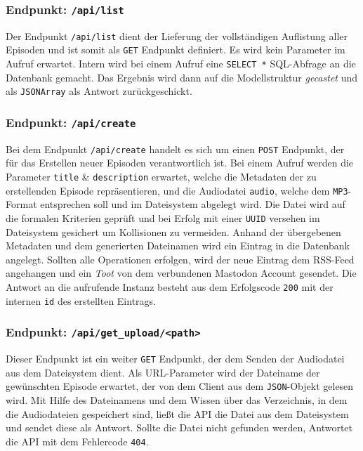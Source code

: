 \documentclass{article}
\begin{document}
\subsubsection{Endpunkt: \texttt{/api/list}}
Der Endpunkt \texttt{/api/list} dient der Lieferung der vollständigen Auflistung aller Episoden und ist somit als \texttt{GET} Endpunkt definiert. Es wird kein Parameter im Aufruf erwartet. Intern wird bei einem Aufruf eine \texttt{SELECT *} SQL-Abfrage an die Datenbank gemacht. Das Ergebnis wird dann auf die Modellstruktur \textit{gecastet} und als \texttt{JSONArray} als Antwort zurückgeschickt.

\subsubsection{Endpunkt: \texttt{/api/create}}
Bei dem Endpunkt \texttt{/api/create} handelt es sich um einen \texttt{POST} Endpunkt, der für das Erstellen neuer Episoden verantwortlich ist. Bei einem Aufruf werden die Parameter \texttt{title} \& \texttt{description} erwartet, welche die Metadaten der zu erstellenden Episode repräsentieren, und die Audiodatei \texttt{audio}, welche dem \texttt{MP3}-Format entsprechen soll und im Dateisystem abgelegt wird. Die Datei wird auf die formalen Kriterien geprüft und bei Erfolg mit einer \texttt{UUID} versehen im Dateisystem gesichert um Kollisionen zu vermeiden. Anhand der übergebenen Metadaten und dem generierten Dateinamen wird ein Eintrag in die Datenbank angelegt. Sollten alle Operationen erfolgen, wird der neue Eintrag dem RSS-Feed angehangen und ein \textit{Toot} von dem verbundenen Mastodon Account gesendet. Die Antwort an die aufrufende Instanz besteht aus dem Erfolgscode \texttt{200} mit der internen \texttt{id} des erstellten Eintrags.

\subsubsection{Endpunkt: \texttt{/api/get\_upload/<path>}}
Dieser Endpunkt ist ein weiter \texttt{GET} Endpunkt, der dem Senden der Audiodatei aus dem Dateisystem dient. Als URL-Parameter wird der Dateiname der gewünschten Episode erwartet, der von dem Client aus dem \texttt{JSON}-Objekt gelesen wird. Mit Hilfe des Dateinamens und dem Wissen über das Verzeichnis, in dem die Audiodateien gespeichert sind, ließt die API die Datei aus dem Dateisystem und sendet diese als Antwort. Sollte die Datei nicht gefunden werden, Antwortet die API mit dem Fehlercode \texttt{404}.
\end{document}
